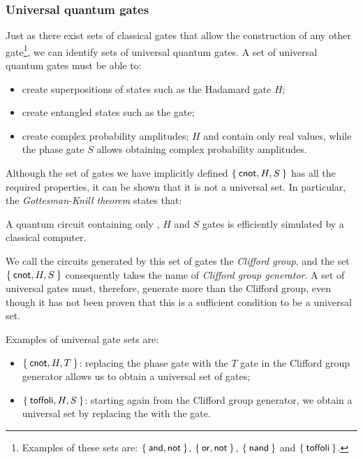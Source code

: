 \subsubsection*{Universal quantum gates}
\label{sec:q_gate_univ}
Just as there exist sets of classical gates that allow the construction of any other gate\footnote{Examples of these sets are: $\Set{\text{\textsf{and}}, \text{\textsf{not}}}$, $\Set{\text{\textsf{or}}, \text{\textsf{not}}}$, $\Set{\text{\textsf{nand}}}$ and $\Set{\text{\textsf{toffoli}}}$.}, we can identify sets of universal quantum gates. A set of universal quantum gates must be able to:
\begin{itemize}
	\item create superpositions of states such as the Hadamard gate $H$;
	\item create entangled states such as the  gate;
	\item create complex probability amplitudes; $H$ and  contain only real values, while the phase gate $S$ allows obtaining complex probability amplitudes.
\end{itemize}
Although the set of gates we have implicitly defined $\Set{\text{\textsf{cnot}}, H, S}$ has all the required properties, it can be shown that it is not a universal set. In particular, the \emph{Gottesman-Knill theorem} states that:
\begin{theorem}
	A quantum circuit containing only  , $H$ and $S$ gates is efficiently simulated by a classical computer.
\end{theorem}
We call the circuits generated by this set of gates the \emph{Clifford group}, and the set $\Set{ \text{\textsf{cnot}}, H, S}$ consequently takes the name of \emph{Clifford group generator}. A set of universal gates must, therefore, generate more than the Clifford group, even though it has not been proven that this is a sufficient condition to be a universal set.

Examples of universal gate sets are: 
\begin{itemize}
	\item $\Set{ \text{\textsf{cnot}}, H, T}$: replacing the phase gate with the $T$ gate in the Clifford group generator allows us to obtain a universal set of gates;
	\item $\Set{ \text{\textsf{toffoli}}, H, S}$: starting again from the Clifford group generator, we obtain a universal set by replacing the  with the  gate.
\end{itemize}

